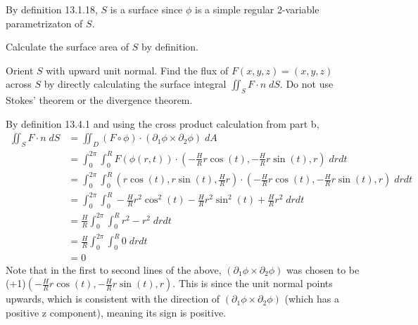 \documentclass{exam}
\begin{document}
\begin{questions}
\begin{parts}
\begin{answer}{580pt}
By definition 13.1.18, $S$ is a surface since $\phi$ is a simple regular 2-variable parametrizaton of $S$.
	\end{answer}
	
	\pagebreak
	\item Calculate the surface area of $S$ by definition. 
	\begin{answer}{600pt}
	\end{answer}

	\pagebreak
	\item Orient $S$ with upward unit normal. Find the flux of $F(x,y,z) = (x,y,z)$ across $S$ by directly calculating the surface integral $\iint_S F \cdot n \; dS$. Do not use Stokes' theorem  or the divergence theorem.
 
\begin{answer}{600pt}
By definition 13.4.1 and using the cross product calculation from part b,\begin{equation*}\begin{split}
    \iint_S F \cdot n \; dS&=\iint_D (F\circ\phi)\cdot(\partial_1\phi\times\partial_2\phi)\;dA \\
    &=\int_0^{2\pi}\int_0^R F(\phi(r,t))\cdot(-\frac{H}{R}r\cos(t),-\frac{H}{R}r\sin(t),r)\; drdt \\
    &=\int_0^{2\pi}\int_0^R (r\cos(t),r\sin(t),\frac{H}{R}r)\cdot(-\frac{H}{R}r\cos(t),-\frac{H}{R}r\sin(t),r)\;drdt \\
    &=\int_0^{2\pi}\int_0^R -\frac{H}{R}r^2\cos^2(t)-\frac{H}{R}r^2\sin^2(t)+\frac{H}{R}r^2 \;drdt \\
    &=\frac{H}{R} \int_0^{2\pi}\int_0^R r^2-r^2 \;drdt \\
    &=\frac{H}{R} \int_0^{2\pi}\int_0^R 0 \;drdt \\
    &=0
\end{split}\end{equation*}Note that in the first to second lines of the above, $(\partial_1\phi\times\partial_2\phi)$ was chosen to be (+1)$(-\frac{H}{R}r\cos(t),-\frac{H}{R}r\sin(t),r)$. This is since the unit normal points upwards, which is consistent with the direction of $(\partial_1\phi\times\partial_2\phi)$ (which has a positive z component), meaning its sign is positive.
\end{answer}

\end{parts}






\end{questions}
\end{document}
